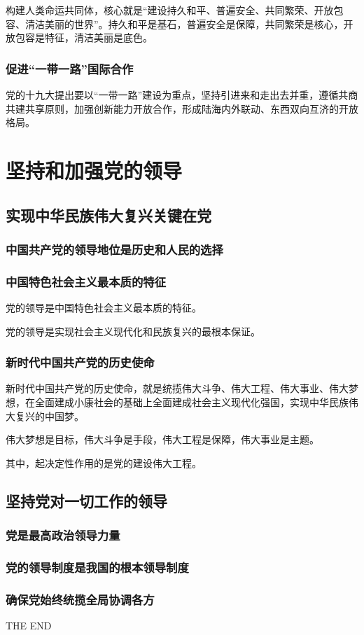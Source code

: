 \documentclass[12pt, a4paper, oneside]{ctexart}
\begin{document}
构建人类命运共同体，核心就是“建设持久和平、普遍安全、共同繁荣、开放包容、清洁美丽的世界”。持久和平是基石，普遍安全是保障，共同繁荣是核心，开放包容是特征，清洁美丽是底色。

\subsubsection{促进“一带一路”国际合作}

党的十九大提出要以“一带一路”建设为重点，坚持引进来和走出去并重，遵循共商共建共享原则，加强创新能力开放合作，形成陆海内外联动、东西双向互济的开放格局。

\section{坚持和加强党的领导}

\subsection{实现中华民族伟大复兴关键在党}

\subsubsection{中国共产党的领导地位是历史和人民的选择}

\subsubsection{中国特色社会主义最本质的特征}

党的领导是中国特色社会主义最本质的特征。

党的领导是实现社会主义现代化和民族复兴的最根本保证。

\subsubsection{新时代中国共产党的历史使命}

新时代中国共产党的历史使命，就是统揽伟大斗争、伟大工程、伟大事业、伟大梦想，在全面建成小康社会的基础上全面建成社会主义现代化强国，实现中华民族伟大复兴的中国梦。

伟大梦想是目标，伟大斗争是手段，伟大工程是保障，伟大事业是主题。

其中，起决定性作用的是党的建设伟大工程。

\subsection{坚持党对一切工作的领导}

\subsubsection{党是最高政治领导力量}

\subsubsection{党的领导制度是我国的根本领导制度}

\subsubsection{确保党始终统揽全局协调各方}

\vspace*{30pt}

\begin{center}
  \Large{THE END}
\end{center}
\end{document}
